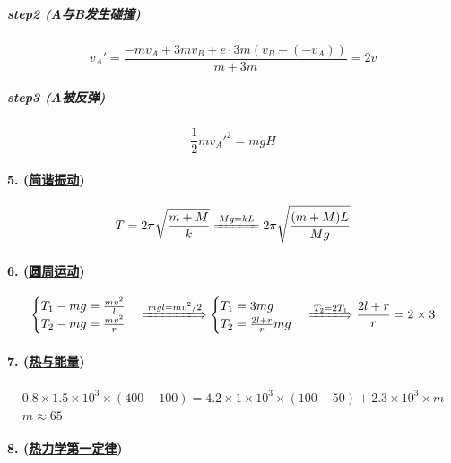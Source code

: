 \subparagraph{step2 (A与B发生碰撞)}

\begin{equation*}
    v_A'=\frac{-mv_A+3mv_B+e\cdot 3m(v_B-(-v_A))}{m+3m}=2v
\end{equation*}

\subparagraph{step3 (A被反弹)}

\begin{equation*}
    \frac12{mv_A'}^2=mgH
\end{equation*}

\paragraph{5. (\hyperref[subsec:简谐振动]{简谐振动})}

\begin{equation*}
    T=2\pi\sqrt{\frac{m+M}{k}}
    \xlongequal{Mg=kL}
    2\pi\sqrt{\frac{(m+M)L}{Mg}}
\end{equation*}

\paragraph{6. (\hyperref[subsec:圆周运动]{圆周运动})}

\begin{equation*}
    \begin{cases}
        T_1-mg=\frac{mv^2}{l}\\
        T_2-mg=\frac{mv^2}{r}
    \end{cases}\xLongrightarrow{mgl=mv^2/2}
    \begin{cases}
        T_1=3mg\\
        T_2=\frac{2l+r}{r}mg
    \end{cases}\xLongrightarrow{T_2=2T_1}
    \frac{2l+r}{r}=2\times3
\end{equation*}

\paragraph{7. (\hyperref[sec:热与能量]{热与能量})}

\begin{gather*}
    0.8\times1.5\times10^3\times(400-100)=
    4.2\times1\times10^3\times(100-50)+2.3\times10^3\times m\\
    m\approx65
\end{gather*}

\paragraph{8. (\hyperref[subsec:热力学第一定律]{热力学第一定律})}

